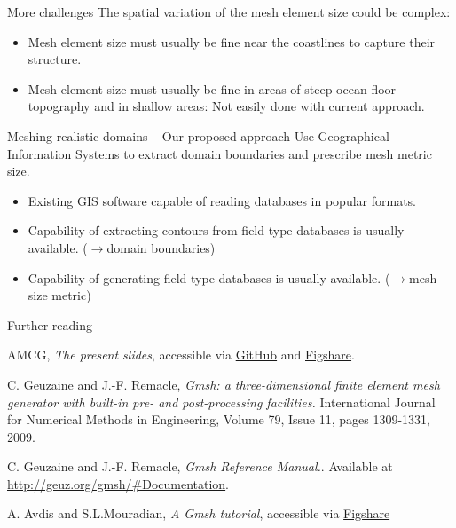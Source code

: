 \documentclass[t]{beamer}
\begin{document}
\begin{frame}{More challenges}
The spatial variation of the mesh element size could be complex:
\begin{itemize}
   \item Mesh element size must usually be fine near the coastlines to capture their structure.\\[15pt]
   \item Mesh element size must usually be fine in areas of steep ocean floor topography and in shallow areas: Not easily done with current approach.
\end{itemize}
\end{frame}

\begin{frame}{Meshing realistic domains -- Our proposed approach}
Use Geographical Information Systems to extract domain boundaries and prescribe mesh metric size.
\begin{itemize}
   \item Existing GIS software capable of reading databases in popular formats.
   \item Capability of extracting contours from field-type databases is usually available. ($\rightarrow$domain boundaries)
   \item Capability of generating field-type databases is usually available. ($\rightarrow$mesh size metric)
\end{itemize}
\end{frame}

\begin{frame}{Further reading}
\begin{thebibliography}{9}

  AMCG, 
  \emph{The present slides},
  accessible via \href{https://github.com/FluidityProject/training}{GitHub} and \href{http://figshare.com/s/0dbd16a2635b11e4a71206ec4b8d1f61}{Figshare}.

  C. Geuzaine and J.-F. Remacle,
  \emph{Gmsh: a three-dimensional finite element mesh generator with built-in pre- and post-processing facilities.}
  International Journal for Numerical Methods in Engineering,
  Volume 79, Issue 11,
  pages 1309-1331, 2009.

  C. Geuzaine and J.-F. Remacle,
  \emph{Gmsh Reference Manual.}.
  Available at
  \url{http://geuz.org/gmsh/\#Documentation}.

  A. Avdis and S.L.Mouradian,
  \emph{A Gmsh tutorial},
  accessible via \href{http://figshare.com/s/16b14b6c650811e483cb06ec4bbcf141}{Figshare}

  \end{thebibliography}

\end{frame}
\end{document}
